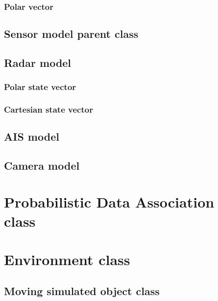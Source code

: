 \subsubsection{Polar \boatspeed vector}

\subsection{Sensor model parent class}

\subsection{Radar model}
\subsubsection{Polar \boatspeed state vector}

\subsubsection{Cartesian \boatspeed state vector}

\subsection{AIS model}

\subsection{Camera model}





\section{Probabilistic Data Association class}

\section{Environment class}

\subsection{Moving simulated object class}

